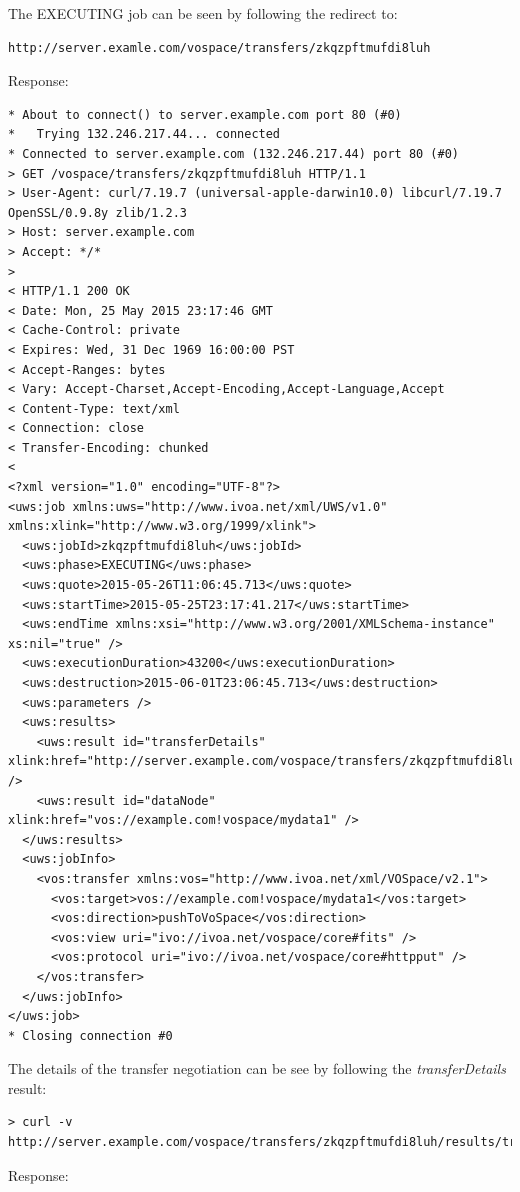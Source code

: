 \documentclass[11pt,a4paper]{ivoa}
\begin{document}
The EXECUTING job can be seen by following the redirect to:
\begin{lstlisting}
http://server.examle.com/vospace/transfers/zkqzpftmufdi8luh
\end{lstlisting}
Response:
\begin{lstlisting}
* About to connect() to server.example.com port 80 (#0)
*   Trying 132.246.217.44... connected
* Connected to server.example.com (132.246.217.44) port 80 (#0)
> GET /vospace/transfers/zkqzpftmufdi8luh HTTP/1.1
> User-Agent: curl/7.19.7 (universal-apple-darwin10.0) libcurl/7.19.7 OpenSSL/0.9.8y zlib/1.2.3
> Host: server.example.com
> Accept: */*
>
< HTTP/1.1 200 OK
< Date: Mon, 25 May 2015 23:17:46 GMT
< Cache-Control: private
< Expires: Wed, 31 Dec 1969 16:00:00 PST
< Accept-Ranges: bytes
< Vary: Accept-Charset,Accept-Encoding,Accept-Language,Accept
< Content-Type: text/xml
< Connection: close
< Transfer-Encoding: chunked
<
<?xml version="1.0" encoding="UTF-8"?>
<uws:job xmlns:uws="http://www.ivoa.net/xml/UWS/v1.0" xmlns:xlink="http://www.w3.org/1999/xlink">
  <uws:jobId>zkqzpftmufdi8luh</uws:jobId>
  <uws:phase>EXECUTING</uws:phase>
  <uws:quote>2015-05-26T11:06:45.713</uws:quote>
  <uws:startTime>2015-05-25T23:17:41.217</uws:startTime>
  <uws:endTime xmlns:xsi="http://www.w3.org/2001/XMLSchema-instance" xs:nil="true" />
  <uws:executionDuration>43200</uws:executionDuration>
  <uws:destruction>2015-06-01T23:06:45.713</uws:destruction>
  <uws:parameters />
  <uws:results>
    <uws:result id="transferDetails" xlink:href="http://server.example.com/vospace/transfers/zkqzpftmufdi8luh/results/transferDetails" />
    <uws:result id="dataNode" xlink:href="vos://example.com!vospace/mydata1" />
  </uws:results>
  <uws:jobInfo>
    <vos:transfer xmlns:vos="http://www.ivoa.net/xml/VOSpace/v2.1">
      <vos:target>vos://example.com!vospace/mydata1</vos:target>
      <vos:direction>pushToVoSpace</vos:direction>
      <vos:view uri="ivo://ivoa.net/vospace/core#fits" />
      <vos:protocol uri="ivo://ivoa.net/vospace/core#httpput" />
    </vos:transfer>
  </uws:jobInfo>
</uws:job>
* Closing connection #0
\end{lstlisting}
The details of the transfer negotiation can be see by following the \emph{transferDetails} result:
\begin{lstlisting}
> curl -v http://server.example.com/vospace/transfers/zkqzpftmufdi8luh/results/transferDetails
\end{lstlisting}
Response:
\end{document}
